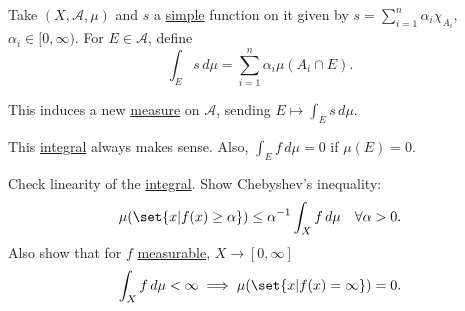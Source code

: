 \documentclass[twoside]{article}
\begin{document}
\begin{defi}
    Take  $(X, \mathscr{A}, \mu)$ and $s$ a \hyperlink{def:simple}{simple} function on it given by $s=\sum_{i=1}^n \alpha_i \chi_{A_i}$, $\alpha_i \in [0, \infty)$.
    For $E \in \mathscr{A}$, define
    \begin{equation*}
        \int_E s \, d\mu = \sum_{i=1}^n \alpha_i \mu(A_i \cap E).
    \end{equation*}
\end{defi}
\begin{remark}
    This induces a new \hyperlink{def:measure}{measure} on $\mathscr{A}$, sending $E \mapsto \int_E s \, d\mu$.
\end{remark}

\begin{remark}
    This \hyperlink{def:integral}{integral} always makes sense. Also, $\int_E f \, d\mu = 0$ if $\mu(E) = 0$.
\end{remark}
\begin{ex}
    Check linearity of the \hyperlink{def:integral}{integral}. Show \hypertarget{def:chebyshev}{Chebyshev's inequality:}
    \begin{equation*}
        \mu(\set{x | f(x) \geq \alpha}) \leq \alpha^{-1} \int_X f \, d\mu \quad \forall \alpha > 0.
    \end{equation*}
    Also show that for $f$ \hyperlink{def:measFunc}{measurable}, $X \to [0, \infty]$
    \begin{equation*}\int_X f \, d\mu < \infty \implies \mu(\set{x | f(x) = \infty}) = 0.\end{equation*}
\end{ex}
\end{document}
